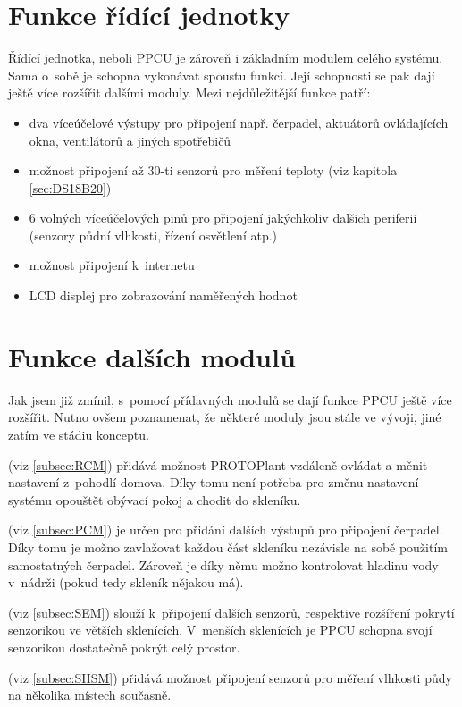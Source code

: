 \section{Funkce řídící jednotky}
Řídící jednotka, neboli PPCU je zároveň i základním modulem celého systému.
Sama o~sobě je schopna vykonávat spoustu funkcí.
Její schopnosti se pak dají ještě více rozšířit dalšími moduly.
Mezi nejdůležitější funkce patří:
\begin{itemize}
    \item dva víceúčelové výstupy pro připojení např. čerpadel, aktuátorů ovláda\-jí\-cích okna, ventilátorů a jiných spotřebičů
    \item možnost připojení až 30-ti senzorů pro měření teploty (viz kapitola \ref{sec:DS18B20})
    \item 6 volných víceúčelových pinů pro připojení jakýchkoliv dalších periferií (senzory půdní vlhkosti, řízení osvětlení atp.)
    \item možnost připojení k~internetu
    \item LCD displej pro zobrazování naměřených hodnot
\end{itemize}

\section{Funkce dalších modulů}
Jak jsem již zmínil, s~pomocí přídavných modulů se dají funkce PPCU ještě více rozšířit.
Nutno ovšem poznamenat, že některé moduly jsou stále ve vývoji, jiné zatím ve stádiu konceptu.
\newline

\noindent{} (viz \autoref{subsec:RCM}) přidává možnost PROTOPlant vzdáleně ovládat a měnit nastavení z~pohodlí domova.
Díky tomu není potřeba pro změnu nastavení systému opouštět obývací pokoj a chodit do skleníku. \newline

\noindent{} (viz \autoref{subsec:PCM}) je určen pro přidání dalších výstupů pro připojení čerpadel.
Díky tomu je možno zavlažovat každou část skleníku nezávisle na sobě použitím samostatných čerpadel. 
Zároveň je díky němu možno kontrolovat hladinu vody v~nádrži (pokud tedy skleník nějakou má).\newline

\noindent{} (viz \autoref{subsec:SEM}) slouží k~připojení dalších senzorů, respektive rozšíření pokrytí senzorikou ve větších sklenících.
V~menších sklenících je PPCU schopna svojí senzorikou dostatečně pokrýt celý prostor.\newline

\noindent{} (viz \autoref{subsec:SHSM}) přidává možnost připojení senzorů pro měření vlhkosti půdy na několika místech současně.\newline

\newpage